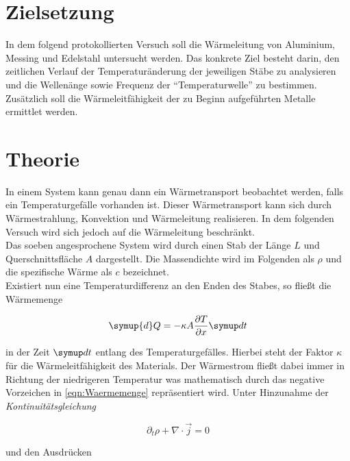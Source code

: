


\section{Zielsetzung}
\label{sec:Zielsetzung}

In dem folgend protokollierten Versuch soll die Wärmeleitung von
Aluminium, Messing und Edelstahl untersucht werden. Das konkrete Ziel besteht
darin, den zeitlichen Verlauf der Temperaturänderung der jeweiligen Stäbe zu analysieren
und die Wellenänge sowie Frequenz der \enquote{Temperaturwelle} zu bestimmen. Zusätzlich soll
die Wärmeleitfähigkeit der zu Beginn aufgeführten Metalle ermittlet werden.

\section{Theorie}
\label{sec:Theorie}

In einem System kann genau dann ein Wärmetransport beobachtet werden, falls ein Temperaturgefälle vorhanden ist. Dieser Wärmetransport kann sich durch Wärmestrahlung, Konvektion und Wärmeleitung
realisieren. In dem folgenden Versuch wird sich jedoch auf die Wärmeleitung beschränkt. \\
Das soeben angesprochene System wird durch einen Stab der Länge $L$ und Querschnittsfläche $A$ dargestellt.
Die Massendichte wird im Folgenden als $\rho$ und die spezifische Wärme als $c$ bezeichnet. \\
Existiert nun eine Temperaturdifferenz an den Enden des Stabes, so fließt die Wärmemenge

\begin{equation}
\label{eqn:Waermemenge}
    \symup {d} Q = -\kappa{}A\frac{\partial{}T}{\partial{}x} \symup d t 
\end{equation}

in der Zeit $\symup d t$ entlang des Temperaturgefälles. Hierbei steht der Faktor $\kappa$ für die Wärmeleitfähigkeit
des Materials. Der Wärmestrom fließt dabei immer in Richtung der niedrigeren Temperatur was mathematisch durch 
das negative Vorzeichen in \eqref{eqn:Waermemenge} repräsentiert wird. Unter Hinzunahme der \emph{Kontinuitätsgleichung}

\begin{equation}
    \partial{}_t \rho + \nabla{}\cdot{}\vec{j} = 0
\end{equation}

und den Ausdrücken

